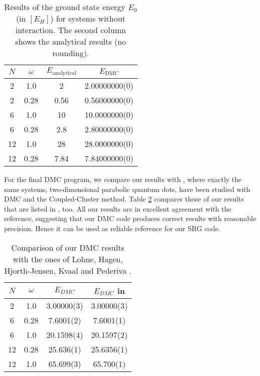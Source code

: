 \begin{table}
\begin{center}
\begin{tabular}{c c c c}
\hline\hline $N$ & $\omega$ & $E_{\text{analytical}}$ & $E_{\text{DMC}}$ \\
\hline  2 & 1.0 & 2 & 2.00000000(0)\\
  2 & 0.28 & 0.56 & 0.56000000(0)\\
  \hline
  6 & 1.0 & 10 & 10.0000000(0) \\
  6 & 0.28 & 2.8 & 2.80000000(0)\\
  \hline
 12 & 1.0 & 28 & 28.0000000(0)\\
 12 & 0.28 & 7.84 &7.84000000(0) \\
\hline\hline
\end{tabular}
\caption{Results of the ground state energy $E_0$ (in $[E_H]$) for  systems  without interaction. The second column shows the analytical results (no rounding).}
\label{tab:nonint}
\end{center}
\end{table}

For the final DMC program, we compare our results with \cite{PhysRevB.84.115302}, where exactly the same systems, two-dimensional parabolic quantum dots, have been studied with DMC and the Coupled-Cluster method. Table \ref{tab:nonint} compares those of our results that are listed in \cite{PhysRevB.84.115302}, too. All our results are in excellent agreement with the reference, suggesting that our DMC code  produces correct results with reasonable precision. Hence it can be used as reliable reference for our SRG code.

\begin{table}
\begin{center}
\begin{tabular}{c c c c}
\hline\hline $N$ & $\omega$ & $E_{DMC}$ & $E_{DMC}$ in \cite{PhysRevB.84.115302} \\
\hline  2 & 1.0 & 3.00000(3) & 3.00000(3) \\
6&0.28 & 7.6001(2) & 7.6001(1)\\
6&1.0 &20.1598(4) & 20.1597(2) \\
12& 0.28&25.636(1) & 25.6356(1) \\
12& 1.0&65.699(3) & 65.700(1) \\
\hline\hline
\end{tabular}
\caption{Comparison of our DMC results with the ones of Lohne, Hagen, Hjorth-Jensen, Kvaal and Pederiva \cite{PhysRevB.84.115302}. }
\label{tab:nonint}
\end{center}
\end{table}

\nocite{kosztin:633}


